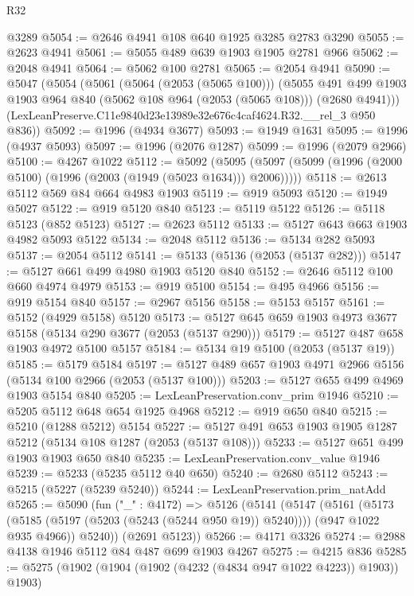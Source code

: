 \begin{lexlean}{R32}
\begin{coremodule}
    @3289
@5054 := @2646 @4941 @108 @640 @1925 @3285 @2783 @3290
@5055 := @2623 @4941
@5061 := @5055 @489 @639 @1903 @1905 @2781 @966
@5062 := @2048 @4941
@5064 := @5062 @100 @2781
@5065 := @2054 @4941
@5090 := @5047
    (@5054
      (@5061
        (@5064 (@2053 (@5065 @100)))
        (@5055
          @491
          @499
          @1903
          @1903
          @964
          @840
          (@5062 @108 @964 (@2053 (@5065 @108)))
          (@2680 @4941)))
      (LexLeanPreserve.C11e9840d23e13989e32e676c4caf4624.R32.__rel_3 @950 @836))
@5092 := @1996 (@4934 @3677)
@5093 := @1949 @1631
@5095 := @1996 (@4937 @5093)
@5097 := @1996 (@2076 @1287)
@5099 := @1996 (@2079 @2966)
@5100 := @4267 @1022
@5112 := @5092
    (@5095 (@5097 (@5099 (@1996 (@2000 @5100) (@1996 (@2003 (@1949 (@5023 @1634))) @2006)))))
@5118 := @2613 @5112 @569 @84 @664 @4983 @1903
@5119 := @919 @5093
@5120 := @1949 @5027
@5122 := @919 @5120 @840
@5123 := @5119 @5122
@5126 := @5118 @5123 (@852 @5123)
@5127 := @2623 @5112
@5133 := @5127 @643 @663 @1903 @4982 @5093 @5122
@5134 := @2048 @5112
@5136 := @5134 @282 @5093
@5137 := @2054 @5112
@5141 := @5133 (@5136 (@2053 (@5137 @282)))
@5147 := @5127 @661 @499 @4980 @1903 @5120 @840
@5152 := @2646 @5112 @100 @660 @4974 @4979
@5153 := @919 @5100
@5154 := @495 @4966
@5156 := @919 @5154 @840
@5157 := @2967 @5156
@5158 := @5153 @5157
@5161 := @5152 (@4929 @5158) @5120
@5173 := @5127 @645 @659 @1903 @4973 @3677 @5158 (@5134 @290 @3677 (@2053 (@5137 @290)))
@5179 := @5127 @487 @658 @1903 @4972 @5100 @5157
@5184 := @5134 @19 @5100 (@2053 (@5137 @19))
@5185 := @5179 @5184
@5197 := @5127 @489 @657 @1903 @4971 @2966 @5156 (@5134 @100 @2966 (@2053 (@5137 @100)))
@5203 := @5127 @655 @499 @4969 @1903 @5154 @840
@5205 := LexLeanPreservation.conv_prim @1946
@5210 := @5205 @5112 @648 @654 @1925 @4968
@5212 := @919 @650 @840
@5215 := @5210 (@1288 @5212) @5154
@5227 := @5127 @491 @653 @1903 @1905 @1287 @5212 (@5134 @108 @1287 (@2053 (@5137 @108)))
@5233 := @5127 @651 @499 @1903 @1903 @650 @840
@5235 := LexLeanPreservation.conv_value @1946
@5239 := @5233 (@5235 @5112 @40 @650)
@5240 := @2680 @5112
@5243 := @5215 (@5227 (@5239 @5240))
@5244 := LexLeanPreservation.prim_natAdd
@5265 := @5090
    (fun ("_" : @4172) =>
    @5126
      (@5141
        (@5147
          (@5161
            (@5173 (@5185 (@5197 (@5203 (@5243 (@5244 @950 @19)) @5240))))
            (@947 @1022 @935 @4966))
          @5240))
      (@2691 @5123))
@5266 := @4171 @3326
@5274 := @2988 @4138 @1946 @5112 @84 @487 @699 @1903 @4267
@5275 := @4215 @836
@5285 := @5275 (@1902 (@1904 (@1902 (@4232 (@4834 @947 @1022 @4223)) @1903)) @1903)

\end{coremodule}
\end{lexlean}
